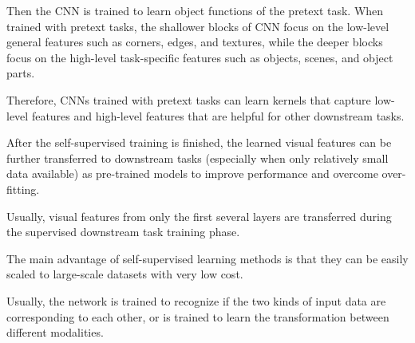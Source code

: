 Then the CNN is trained to learn object functions of the pretext task. When trained
with pretext tasks, the shallower blocks of CNN focus on the low-level general
features such as corners, edges, and textures, while the deeper blocks focus on
the high-level task-specific features such as objects, scenes, and object parts.

Therefore, CNNs trained with pretext tasks can learn kernels that capture low-level
features and high-level features that are helpful for other downstream tasks.

After the self-supervised training is finished, the learned visual features can
be further transferred to downstream tasks (especially when only relatively small
data available) as pre-trained models to improve performance and overcome over-fitting.

Usually, visual features from only the first several layers are transferred during
the supervised downstream task training phase.

The main advantage of self-supervised learning methods is that they can be easily
scaled to large-scale datasets with very low cost.

Usually, the network is trained to recognize if the two kinds of input data are 
corresponding to each other, or is trained to learn the transformation between 
different modalities.

